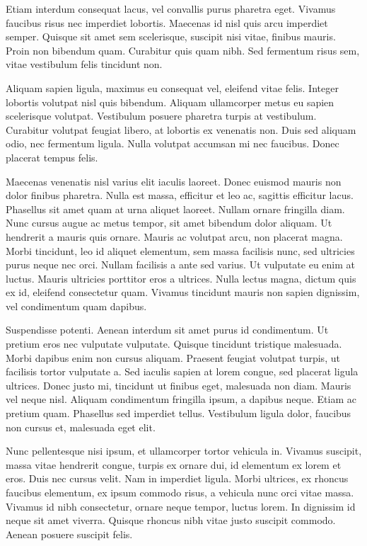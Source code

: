 \documentclass[10pt]{article}
\begin{document}
	Etiam interdum consequat lacus, vel convallis purus pharetra eget. Vivamus faucibus risus nec imperdiet lobortis. Maecenas id nisl quis arcu imperdiet semper. Quisque sit amet sem scelerisque, suscipit nisi vitae, finibus mauris. Proin non bibendum quam. Curabitur quis quam nibh. Sed fermentum risus sem, vitae vestibulum felis tincidunt non.
	
	Aliquam sapien ligula, maximus eu consequat vel, eleifend vitae felis. Integer lobortis volutpat nisl quis bibendum. Aliquam ullamcorper metus eu sapien scelerisque volutpat. Vestibulum posuere pharetra turpis at vestibulum. Curabitur volutpat feugiat libero, at lobortis ex venenatis non. Duis sed aliquam odio, nec fermentum ligula. Nulla volutpat accumsan mi nec faucibus. Donec placerat tempus felis.
	
	
	
	Maecenas venenatis nisl varius elit iaculis laoreet. Donec euismod mauris non dolor finibus pharetra. Nulla est massa, efficitur et leo ac, sagittis efficitur lacus. Phasellus sit amet quam at urna aliquet laoreet. Nullam ornare fringilla diam. Nunc cursus augue ac metus tempor, sit amet bibendum dolor aliquam. Ut hendrerit a mauris quis ornare. Mauris ac volutpat arcu, non placerat magna. Morbi tincidunt, leo id aliquet elementum, sem massa facilisis nunc, sed ultricies purus neque nec orci. Nullam facilisis a ante sed varius. Ut vulputate eu enim at luctus. Mauris ultricies porttitor eros a ultrices. Nulla lectus magna, dictum quis ex id, eleifend consectetur quam. Vivamus tincidunt mauris non sapien dignissim, vel condimentum quam dapibus.
	
	Suspendisse potenti. Aenean interdum sit amet purus id condimentum. Ut pretium eros nec vulputate vulputate. Quisque tincidunt tristique malesuada. Morbi dapibus enim non cursus aliquam. Praesent feugiat volutpat turpis, ut facilisis tortor vulputate a. Sed iaculis sapien at lorem congue, sed placerat ligula ultrices. Donec justo mi, tincidunt ut finibus eget, malesuada non diam. Mauris vel neque nisl. Aliquam condimentum fringilla ipsum, a dapibus neque. Etiam ac pretium quam. Phasellus sed imperdiet tellus. Vestibulum ligula dolor, faucibus non cursus et, malesuada eget elit.
	
	Nunc pellentesque nisi ipsum, et ullamcorper tortor vehicula in. Vivamus suscipit, massa vitae hendrerit congue, turpis ex ornare dui, id elementum ex lorem et eros. Duis nec cursus velit. Nam in imperdiet ligula. Morbi ultrices, ex rhoncus faucibus elementum, ex ipsum commodo risus, a vehicula nunc orci vitae massa. Vivamus id nibh consectetur, ornare neque tempor, luctus lorem. In dignissim id neque sit amet viverra. Quisque rhoncus nibh vitae justo suscipit commodo. Aenean posuere suscipit felis.
	
\end{document}
